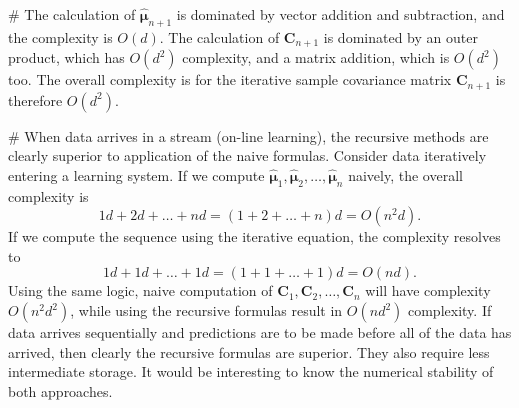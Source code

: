 \documentclass[12pt, a4paper]{article}
\newcommand{\vect}[1]{\bm{#1}}
\begin{document}
\begin{easylist}[enumerate]
	
	# The calculation of $\hat{\vect{\mu}}_{n+1}$ is dominated by vector addition and subtraction, and the complexity is $O(d)$.
	The calculation of $\vect{C}_{n+1}$ is dominated by an outer product, which has $O(d^2)$ complexity, and a matrix addition, which is $O(d^2)$ too.
	The overall complexity is for the iterative sample covariance matrix $\vect{C}_{n+1}$ is therefore $O(d^2)$.
	
	# When data arrives in a stream (on-line learning), the recursive methods are clearly superior to  application of the naive formulas.
	Consider data iteratively entering a learning system.
	If we compute $\hat{\vect{\mu}}_{1}, \hat{\vect{\mu}}_{2}, \dots, \hat{\vect{\mu}}_{n}$ naively, the overall complexity is
	\begin{equation*}
	1d + 2d + \dots + nd = \left(1 + 2 + \dots + n\right) d = O(n^2 d).
	\end{equation*}
	If we compute the sequence using the iterative equation, the complexity resolves to
	\begin{equation*}
	1d + 1d + \dots + 1d = \left(1 + 1 + \dots + 1\right) d = O(n d).
	\end{equation*}
	Using the same logic, naive computation of $\vect{C}_{1}, \vect{C}_{2}, \dots, \vect{C}_{n}$ will have complexity $O(n^2 d^2)$, while using the recursive formulas result in $O(nd^2)$ complexity. 
	If data arrives sequentially and predictions are to be made before all of the data has arrived, then clearly the recursive formulas are superior.
	They also require less intermediate storage.
	It would be interesting to know the numerical stability of both approaches.
	
\end{easylist}
\end{document}
